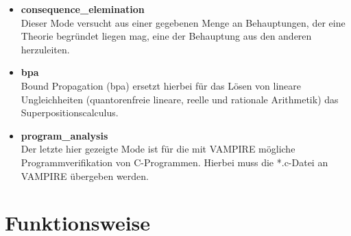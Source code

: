 \documentclass{article}
\begin{document}
\begin{itemize}
	\item \textbf{consequence\_elemination} \\
	Dieser Mode versucht aus einer gegebenen Menge an Behauptungen, der eine Theorie begründet liegen mag, eine der Behauptung aus den anderen herzuleiten.\\
	\item \textbf{bpa} \\
	Bound Propagation (bpa) ersetzt hierbei für das Lösen von lineare Ungleichheiten (quantorenfreie lineare, reelle und rationale Arithmetik) das Superpositionscalculus.
	\item \textbf{program\_analysis} \\
	Der letzte hier gezeigte Mode ist für die mit VAMPIRE mögliche Programmverifikation von C-Programmen. Hierbei muss die *.c-Datei an VAMPIRE übergeben werden.
\end{itemize}







\section{Funktionsweise}
\label{sec:mechanics}
\end{document}
